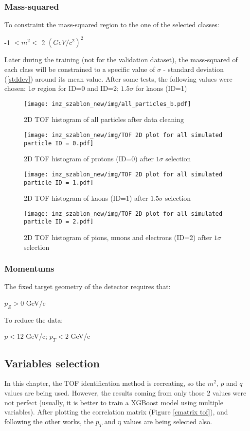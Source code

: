 \subsubsection{Mass-squared}
To constraint the mass-squared region to the one of the selected classes:
\begin{center}
    -1 $ < m^2 < $ 2 $(GeV/c^2)^2$
\end{center}
Later during the training (not for the validation dataset), the mass-squared of each class will be constrained to a specific value of $\sigma$ - standard deviation (\ref{stddev}) around its mean value. After some tests, the following values were chosen: $1 \sigma$ region for ID=0 and ID=2; $1.5 \sigma$ for kaons (ID=1)
\begin{figure}[H]
    \centering
    \texttt{[image: inz\_szablon\_new/img/all\_particles\_b.pdf]}
    \caption{2D TOF histogram of all particles after data cleaning}
\end{figure}
\begin{figure}[H]
    \centering
    \texttt{[image: inz\_szablon\_new/img/TOF 2D plot for all simulated particle ID = 0.pdf]}
    \caption{2D TOF histogram of protons (ID=0) after $1 \sigma$ selection}
\end{figure}
\begin{figure}[H]
    \centering
    \texttt{[image: inz\_szablon\_new/img/TOF 2D plot for all simulated particle ID = 1.pdf]}
    \caption{2D TOF histogram of kaons (ID=1) after $1.5 \sigma$ selection}
\end{figure}
\begin{figure}[H]
    \centering
    \texttt{[image: inz\_szablon\_new/img/TOF 2D plot for all simulated particle ID = 2.pdf]}
    \caption{2D TOF histogram of pions, muons and electrons (ID=2) after $1 \sigma$ selection}
\end{figure}
\subsubsection{Momentums}
The fixed target geometry of the detector requires that:
\begin{center}
    $p_Z > 0 $ GeV/c
\end{center}
To reduce the data:
\begin{center}
    $p < 12$ GeV/c; $p_T < 2$ GeV/c
\end{center}
\subsection{Variables selection}
In this chapter, the TOF identification method is recreating, so the $m^2$, $p$ and $q$ values are being used. However, the results coming from only those 2 values were not perfect (usually, it is better to train a XGBoost model using multiple variables). After plotting the correlation matrix (Figure \ref{cmatrix tof}), and following the other works\cite{ostrowski}, the $p_T$ and $\eta$ values are being selected also. 

